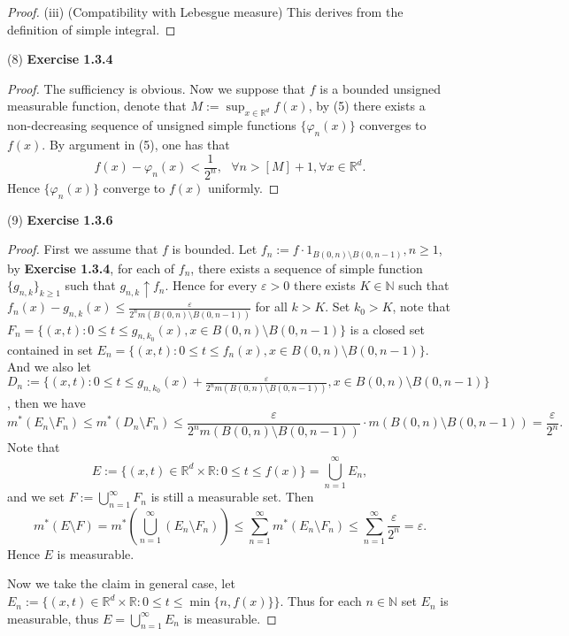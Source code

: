 \documentclass[a4paper]{article}
\begin{document}
\begin{proof}
(iii) (Compatibility with Lebesgue measure) This derives from the definition of simple integral.
\end{proof}

(8) {\bfseries Exercise 1.3.4}\begin{proof}
The sufficiency is obvious. Now we suppose that $f$ is a bounded unsigned measurable function, denote that
$M := \sup_{x \in \mathbb{R}^d} f(x)$, by (5) there exists a non-decreasing sequence of unsigned simple functions
$\{\varphi_n(x)\}$ converges to $f(x)$. By argument in (5), one has that $$
f(x) - \varphi_n(x) < \frac{1}{2^n},\ \ \ \forall n > [M] + 1, \forall x \in \mathbb{R}^d.
$$Hence $\{\varphi_n(x)\}$ converge to $f(x)$ uniformly.
\end{proof}

(9) {\bfseries Exercise 1.3.6}\begin{proof}
First we assume that $f$ is bounded. Let $f_n := f\cdot 1_{B(0, n) \setminus B(0, n - 1)}, n \geq 1$, by {\bfseries Exercise 1.3.4}, 
for each of $f_n$, there exists a sequence of simple function $\{g_{n, k}\}_{k \geq 1}$ such that $g_{n, k} \uparrow f_n$.
Hence for every $\varepsilon > 0$ there exists $K \in \mathbb{N}$ such that 
$f_n(x) - g_{n, k}(x) \leq \frac{\varepsilon}{2^n m(B(0, n)\setminus B(0, n -1))}$ for all $k > K$. Set $k_0 > K$, 
note that $F_n = \{(x, t): 0 \leq t \leq g_{n, k_0}(x), x \in B(0, n) \setminus B(0, n - 1)\}$ is a closed set 
contained in set $E_n = \{(x, t) : 0 \leq t \leq f_n(x), x \in B(0, n) \setminus B(0, n - 1)\}$.
And we also let $D_n := \{(x, t) : 0  \leq t \leq g_{n, k_0}(x) + \frac{\varepsilon}{2^n m(B(0, n)\setminus B(0, n -1))}, 
x \in B(0, n) \setminus B(0, n - 1)\}$, then we have $$
m^*(E_n \setminus F_n) \leq m^*(D_n \setminus F_n) \leq \frac{\varepsilon}{2^n m(B(0, n)\setminus B(0, n -1))}
\cdot m(B(0, n) \setminus B(0, n - 1)) = \frac{\varepsilon}{2^n}.
$$Note that $$
E := \{(x, t) \in \mathbb{R}^d \times \mathbb{R} : 0 \leq t \leq f(x)\} = \bigcup_{n = 1}^\infty E_n,
$$and we set $F := \bigcup_{n = 1}^\infty F_n$ is still a measurable set. Then $$
m^*(E \setminus F) = m^*(\bigcup_{n = 1}^\infty (E_n \setminus F_n)) \leq \sum_{n = 1}^\infty m^*(E_n \setminus F_n)
\leq \sum_{n = 1}^\infty \frac{\varepsilon}{2^n} = \varepsilon.
$$Hence $E$ is measurable.

Now we take the claim in general case, let $E_n := \{(x, t) \in \mathbb{R}^d \times \mathbb{R} : 0 \leq t \leq \min\{n, f(x)\}\}$.
Thus for each $n \in \mathbb{N}$ set $E_n$ is measurable, thus $E = \bigcup_{n = 1}^\infty E_n$ is measurable.
\end{proof}
\end{document}
